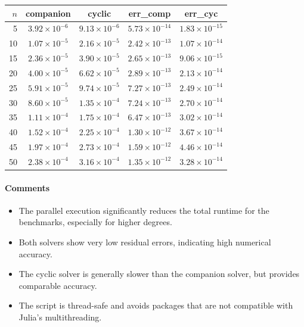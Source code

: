 \documentclass{article}
\begin{document}
\begin{center}
\begin{tabular}{rcccc}
\hline
$n$ & companion & cyclic & err\_comp & err\_cyc \\
\hline
5  & $3.92\times10^{-6}$ & $9.13\times10^{-6}$ & $5.73\times10^{-14}$ & $1.83\times10^{-15}$ \\
10 & $1.07\times10^{-5}$ & $2.16\times10^{-5}$ & $2.42\times10^{-13}$ & $1.07\times10^{-14}$ \\
15 & $2.36\times10^{-5}$ & $3.90\times10^{-5}$ & $2.65\times10^{-13}$ & $9.06\times10^{-15}$ \\
20 & $4.00\times10^{-5}$ & $6.62\times10^{-5}$ & $2.89\times10^{-13}$ & $2.13\times10^{-14}$ \\
25 & $5.91\times10^{-5}$ & $9.74\times10^{-5}$ & $7.27\times10^{-13}$ & $2.49\times10^{-14}$ \\
30 & $8.60\times10^{-5}$ & $1.35\times10^{-4}$ & $7.24\times10^{-13}$ & $2.70\times10^{-14}$ \\
35 & $1.11\times10^{-4}$ & $1.75\times10^{-4}$ & $6.47\times10^{-13}$ & $3.02\times10^{-14}$ \\
40 & $1.52\times10^{-4}$ & $2.25\times10^{-4}$ & $1.30\times10^{-12}$ & $3.67\times10^{-14}$ \\
45 & $1.97\times10^{-4}$ & $2.73\times10^{-4}$ & $1.59\times10^{-12}$ & $4.46\times10^{-14}$ \\
50 & $2.38\times10^{-4}$ & $3.16\times10^{-4}$ & $1.35\times10^{-12}$ & $3.28\times10^{-14}$ \\
\hline
\end{tabular}
\end{center}

\paragraph{Comments}
\begin{itemize}
  \item The parallel execution significantly reduces the total runtime for the benchmarks, especially for higher degrees.
  \item Both solvers show very low residual errors, indicating high numerical accuracy.
  \item The cyclic solver is generally slower than the companion solver, but provides comparable accuracy.
  \item The script is thread-safe and avoids packages that are not compatible with Julia's multithreading.
\end{itemize}
\end{document}
